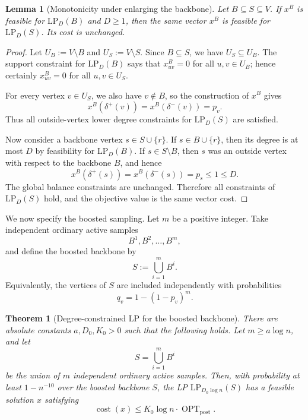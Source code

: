 \documentclass[11pt]{article}
\newtheorem{theorem}{Theorem}
\newtheorem{lemma}{Lemma}
\DeclareMathOperator{\OPT}{OPT}
\newcommand{\1}{\mathbf{1}}
\newcommand{\cost}{\operatorname{cost}}
\begin{document}
\begin{lemma}[Monotonicity under enlarging the backbone]
\label{lem:monotonicity}
Let $B\subseteq S\subseteq V$.  If $x^B$ is feasible for
$\mathrm{LP}_{D}(B)$ and $D\ge 1$, then the same vector $x^B$ is feasible for
$\mathrm{LP}_{D}(S)$.  Its cost is unchanged.
\end{lemma}

\begin{proof}
Let $U_B:=V\setminus B$ and $U_S:=V\setminus S$.  Since $B\subseteq S$, we have
$U_S\subseteq U_B$.  The support constraint for $\mathrm{LP}_{D}(B)$ says that
$x^B_{uv}=0$ for all $u,v\in U_B$; hence certainly $x^B_{uv}=0$ for all
$u,v\in U_S$.

For every vertex $v\in U_S$, we also have $v\notin B$, so the construction of
$x^B$ gives
\[
  x^B(\delta^+(v))=x^B(\delta^-(v))=p_v.
\]
Thus all outside-vertex lower degree constraints for $\mathrm{LP}_{D}(S)$ are
satisfied.

Now consider a backbone vertex $s\in S\cup\{r\}$.  If $s\in B\cup\{r\}$, then
its degree is at most $D$ by feasibility for $\mathrm{LP}_{D}(B)$.  If
$s\in S\setminus B$, then $s$ was an outside vertex with respect to the
backbone $B$, and hence
\[
  x^B(\delta^+(s))=x^B(\delta^-(s))=p_s\le 1\le D.
\]
The global balance constraints are unchanged.  Therefore all constraints of
$\mathrm{LP}_{D}(S)$ hold, and the objective value is the same vector cost.
\end{proof}

We now specify the boosted sampling.  Let $m$ be a positive integer.  Take
independent ordinary active samples
\[
  B^1,B^2,\ldots,B^m,
\]
and define the boosted backbone by
\[
  S:=\bigcup_{i=1}^m B^i.
\]
Equivalently, the vertices of $S$ are included independently with probabilities
\[
  q_v=1-(1-p_v)^m.
\]

\begin{theorem}[Degree-constrained LP for the boosted backbone]
\label{thm:boosted-backbone-lp}
There are absolute constants $a,D_0,K_0>0$ such that the following holds.  Let
$m\ge a\log n$, and let
\[
  S=\bigcup_{i=1}^m B^i
\]
be the union of $m$ independent ordinary active samples.  Then, with probability
at least $1-n^{-10}$ over the boosted backbone $S$, the LP
$\mathrm{LP}_{D_0\log n}(S)$ has a feasible solution $x$ satisfying
\[
  \cost(x)\le K_0\log n\cdot \OPT_{\mathrm{post}}.
\]
\end{theorem}
\end{document}
